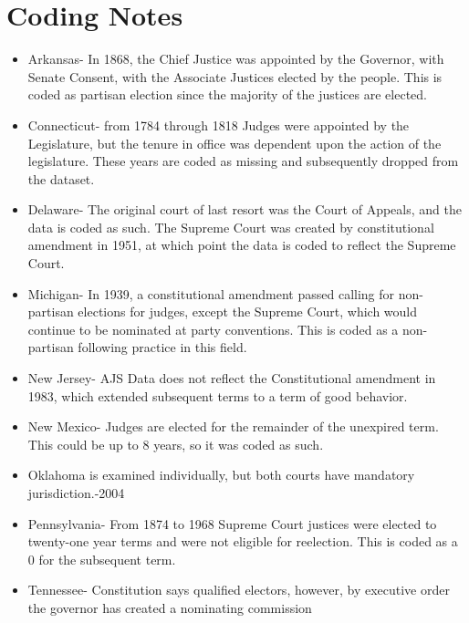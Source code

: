 \documentclass[12pt]{article}
\begin{document}
\section{Coding Notes}\label{CodingNotes}
\begin{itemize}
	\item Arkansas- In 1868, the Chief Justice was appointed by the Governor, with Senate Consent, with the Associate Justices elected by the people.  This is coded as partisan election since the majority of the justices are elected.
	
	\item Connecticut- from 1784 through 1818 Judges were appointed by the Legislature, but the tenure in office was dependent upon the action of the legislature.  These years are coded as missing and subsequently dropped from the dataset.
	
	\item Delaware- The original court of last resort was the Court of Appeals, and the data is coded as such.  The Supreme Court was created by constitutional amendment in 1951, at which point the data is coded to reflect the Supreme Court.
	
	\item Michigan- In 1939, a constitutional amendment passed calling for non-partisan elections for judges, except the Supreme Court, which would continue to be nominated at party conventions.  This is coded as a non-partisan following practice in this field.
	
	\item New Jersey- AJS Data does not reflect the Constitutional amendment in 1983, which extended subsequent terms to a term of good behavior.
	
	\item New Mexico- Judges are elected for the remainder of the unexpired term.  This could be up to 8 years, so it was coded as such.
	
	\item Oklahoma is examined individually, but both courts have mandatory jurisdiction.-2004
	
	\item Pennsylvania- From 1874 to 1968 Supreme Court justices were elected to twenty-one year terms and were not eligible for reelection.  This is coded as a 0 for the subsequent term.
	
	\item Tennessee- Constitution says qualified electors, however, by executive order the governor has created a nominating commission
	

\end{itemize}
\end{document}
